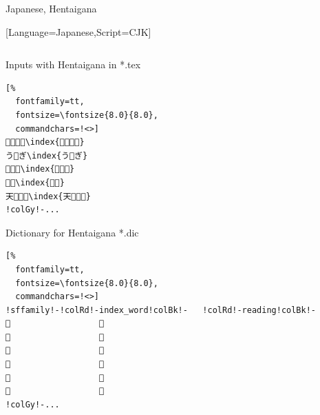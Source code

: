 \documentclass[aspectratio=169,10pt]{beamer}
\begin{document}
\begin{frame}[fragile]{Japanese, Hentaigana}

\setmonofont{ipamjm.ttf}[Language=Japanese,Script=CJK]
\begin{columns}
\begin{column}{57mm}
\begin{exampleblock}{Inputs with Hentaigana in *.tex}
\begin{Verbatim}[%
  fontfamily=tt,
  fontsize=\fontsize{8.0}{8.0},
  commandchars=!<>]
𛀥𛁛𛂦゙\index{𛀥𛁛𛂦゙}
う𛂁ぎ\index{う𛂁ぎ}
𛁈る𛀸\index{𛁈る𛀸}
𛁋𛁅\index{𛁋𛁅}
天𛂱゚𛃭\index{天𛂱゚𛃭}
!colGy!-...
\end{Verbatim}
\end{exampleblock}
\begin{exampleblock}{Dictionary for Hentaigana *.dic}
\setsansfont{Noto Sans}
\begin{Verbatim}[%
  fontfamily=tt,
  fontsize=\fontsize{8.0}{8.0},
  commandchars=!<>]
!sffamily!-!colRd!-index_word!colBk!-   !colRd!-reading!colBk!-
𛀥                  き
𛁛                  そ
𛂦                  は
𛂁                  な
𛁈                  し
𛀸                  こ
!colGy!-...
\end{Verbatim}
\end{exampleblock}
\end{column}

\begin{column}{82mm}
\begin{center}
%
\end{center}
\end{column}
\end{columns}

\end{frame}

\end{document}
